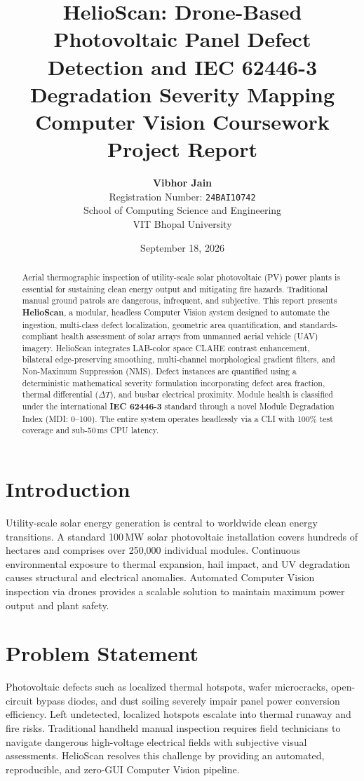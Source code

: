 \documentclass[11pt,a4paper]{article}
\title{\textbf{HelioScan: Drone-Based Photovoltaic Panel Defect Detection and IEC 62446-3 Degradation Severity Mapping}\\[0.5em]\large Computer Vision Coursework Project Report}
\author{\textbf{Vibhor Jain}\\Registration Number: \texttt{24BAI10742}\\School of Computing Science and Engineering\\VIT Bhopal University}
\date{September 18, 2026}
\begin{document}
\maketitle
\thispagestyle{empty}
\vspace{2em}
\begin{abstract}
Aerial thermographic inspection of utility-scale solar photovoltaic (PV) power plants is essential for sustaining clean energy output and mitigating fire hazards. Traditional manual ground patrols are dangerous, infrequent, and subjective. This report presents \textbf{HelioScan}, a modular, headless Computer Vision system designed to automate the ingestion, multi-class defect localization, geometric area quantification, and standards-compliant health assessment of solar arrays from unmanned aerial vehicle (UAV) imagery. HelioScan integrates LAB-color space CLAHE contrast enhancement, bilateral edge-preserving smoothing, multi-channel morphological gradient filters, and Non-Maximum Suppression (NMS). Defect instances are quantified using a deterministic mathematical severity formulation incorporating defect area fraction, thermal differential ($\Delta T$), and busbar electrical proximity. Module health is classified under the international \textbf{IEC 62446-3} standard through a novel Module Degradation Index (MDI: 0--100). The entire system operates headlessly via a CLI with 100\% test coverage and sub-50\,ms CPU latency.
\end{abstract}

\newpage
\tableofcontents
\newpage

\section{Introduction}
Utility-scale solar energy generation is central to worldwide clean energy transitions. A standard 100\,MW solar photovoltaic installation covers hundreds of hectares and comprises over 250,000 individual modules. Continuous environmental exposure to thermal expansion, hail impact, and UV degradation causes structural and electrical anomalies. Automated Computer Vision inspection via drones provides a scalable solution to maintain maximum power output and plant safety.

\section{Problem Statement}
Photovoltaic defects such as localized thermal hotspots, wafer microcracks, open-circuit bypass diodes, and dust soiling severely impair panel power conversion efficiency. Left undetected, localized hotspots escalate into thermal runaway and fire risks. Traditional handheld manual inspection requires field technicians to navigate dangerous high-voltage electrical fields with subjective visual assessments. HelioScan resolves this challenge by providing an automated, reproducible, and zero-GUI Computer Vision pipeline.
\end{document}
